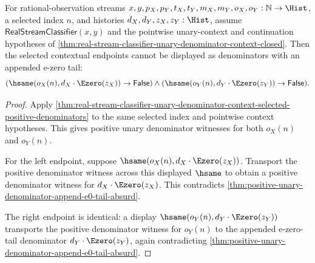 \begin{theorem}
\label{thm:real-stream-classifier-unary-denominator-context-appended-e0-tail-absurd}
For rational-observation streams
$x,y,p_X,p_Y,t_X,t_Y,m_X,m_Y,o_X,o_Y:\mathbb{N}\to\Hist$, a selected
index $n$, and histories $d_X,d_Y,z_X,z_Y:\Hist$, assume
$\mathsf{RealStreamClassifier}(x,y)$ and the pointwise unary-context and
continuation hypotheses of
\autoref{thm:real-stream-classifier-unary-denominator-context-closed}. Then
the selected contextual endpoints cannot be displayed as denominators with an
appended e-zero tail:
$$
(\hsame(o_X(n),d_X\cdot\Ezero(z_X))\to\mathsf{False})\land
(\hsame(o_Y(n),d_Y\cdot\Ezero(z_Y))\to\mathsf{False}).
$$
\end{theorem}
\begin{proof}
Apply
\autoref{thm:real-stream-classifier-unary-denominator-context-selected-positive-denominators}
to the same selected index and pointwise context hypotheses. This gives
positive unary denominator witnesses for both $o_X(n)$ and $o_Y(n)$.

For the left endpoint, suppose $\hsame(o_X(n),d_X\cdot\Ezero(z_X))$.
Transport the positive denominator witness across this displayed $\hsame$ to
obtain a positive denominator witness for $d_X\cdot\Ezero(z_X)$. This
contradicts
\autoref{thm:positive-unary-denominator-append-e0-tail-absurd}.

The right endpoint is identical: a display
$\hsame(o_Y(n),d_Y\cdot\Ezero(z_Y))$ transports the positive denominator
witness for $o_Y(n)$ to the appended e-zero-tail denominator
$d_Y\cdot\Ezero(z_Y)$, again contradicting
\autoref{thm:positive-unary-denominator-append-e0-tail-absurd}.
\end{proof}

